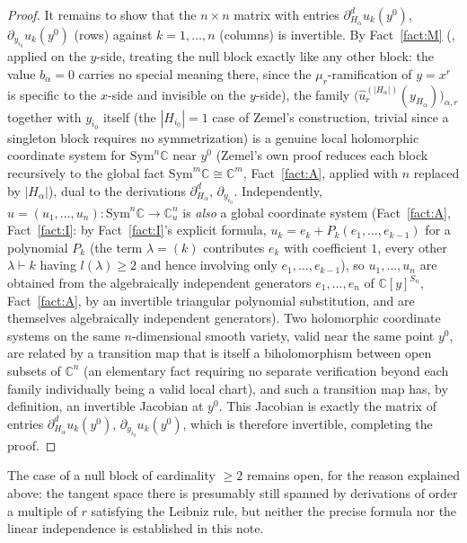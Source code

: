 \documentclass[10pt,a4paper]{amsart}
\newcommand{\CC}{\mathbb{C}}
\begin{document}
\begin{proof}
It remains to show that the $n\times n$ matrix with entries $\partial_{H_\alpha}^du_k(y^0)$, $\partial_{y_{i_0}}u_k(y^0)$ (rows) against $k=1,\dots,n$ (columns) is invertible. By Fact~\ref{fact:M} (\cite[Theorem~34]{Ze}, applied on the $y$-side, treating the null block exactly like any other block: the value $b_\alpha=0$ carries no special meaning there, since the $\mu_r$-ramification of $y=x^r$ is specific to the $x$-side and invisible on the $y$-side), the family $\big(\hat u_r^{(|H_\alpha|)}(y_{H_\alpha})\big)_{\alpha,r}$ together with $y_{i_0}$ itself (the $|H_{i_0}|=1$ case of Zemel's construction, trivial since a singleton block requires no symmetrization) is a genuine local holomorphic coordinate system for $\mathrm{Sym}^n\CC$ near $y^0$ (Zemel's own proof reduces each block recursively to the global fact $\mathrm{Sym}^m\CC\cong\CC^m$, Fact~\ref{fact:A}, applied with $n$ replaced by $|H_\alpha|$), dual to the derivations $\partial_{H_\alpha}^d$, $\partial_{y_{i_0}}$. Independently, $u=(u_1,\dots,u_n):\mathrm{Sym}^n\CC\to\CC^n_u$ is \emph{also} a global coordinate system (Fact~\ref{fact:A}, Fact~\ref{fact:I}: by Fact~\ref{fact:I}'s explicit formula, $u_k=e_k+P_k(e_1,\dots,e_{k-1})$ for a polynomial $P_k$ (the term $\lambda=(k)$ contributes $e_k$ with coefficient $1$, every other $\lambda\vdash k$ having $l(\lambda)\ge2$ and hence involving only $e_1,\dots,e_{k-1}$), so $u_1,\dots,u_n$ are obtained from the algebraically independent generators $e_1,\dots,e_n$ of $\CC[y]^{S_n}$, Fact~\ref{fact:A}, by an invertible triangular polynomial substitution, and are themselves algebraically independent generators). Two holomorphic coordinate systems on the same $n$-dimensional smooth variety, valid near the same point $y^0$, are related by a transition map that is itself a biholomorphism between open subsets of $\CC^n$ (an elementary fact requiring no separate verification beyond each family individually being a valid local chart), and such a transition map has, by definition, an invertible Jacobian at $y^0$. This Jacobian is exactly the matrix of entries $\partial_{H_\alpha}^du_k(y^0)$, $\partial_{y_{i_0}}u_k(y^0)$, which is therefore invertible, completing the proof.
\end{proof}

The case of a null block of cardinality $\ge2$ remains open, for the reason explained above: the tangent space there is presumably still spanned by derivations of order a multiple of $r$ satisfying the Leibniz rule, but neither the precise formula nor the linear independence is established in this note.
\end{document}
